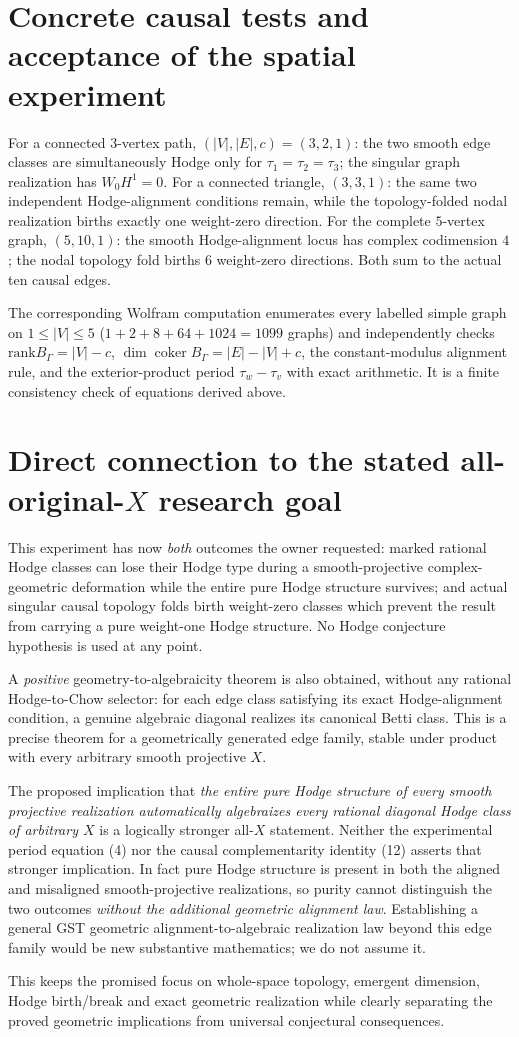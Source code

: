 \documentclass[11pt]{article}
\begin{document}
\section{Concrete causal tests and acceptance of the spatial experiment}
For a connected $3$-vertex path, $(|V|,|E|,c)=(3,2,1)$:
the two smooth edge classes are simultaneously Hodge
only for $\tau_1=\tau_2=\tau_3$;
the singular graph realization has $W_0H^1=0$.
For a connected triangle, $(3,3,1)$:
the same two independent Hodge-alignment conditions
remain, while the topology-folded nodal realization
births exactly one weight-zero direction.
For the complete $5$-vertex graph, $(5,10,1)$:
the smooth Hodge-alignment locus has complex
codimension $4$; the nodal topology fold births
$6$ weight-zero directions. Both sum to the
actual ten causal edges.

The corresponding Wolfram computation enumerates
every labelled simple graph on $1\le |V|\le5$
($1+2+8+64+1024=1099$ graphs) and independently
checks $\mathrm{rank} B_\Gamma=|V|-c$,
$\dim\operatorname{coker}B_\Gamma=|E|-|V|+c$,
the constant-modulus alignment rule, and the
exterior-product period
$\tau_w-\tau_v$ with exact arithmetic. It is a
finite consistency check of equations derived above.

\section{Direct connection to the stated all-original-$X$ research goal}
This experiment has now \emph{both} outcomes the
owner requested: marked rational Hodge classes
can lose their Hodge type during a smooth-projective
complex-geometric deformation while the entire
pure Hodge structure survives; and actual singular
causal topology folds birth weight-zero classes
which prevent the result from carrying a pure
weight-one Hodge structure. No Hodge conjecture
hypothesis is used at any point.

A \emph{positive} geometry-to-algebraicity theorem
is also obtained, without any rational Hodge-to-Chow
selector: for each edge class satisfying its exact
Hodge-alignment condition, a genuine algebraic
diagonal realizes its canonical Betti class.
This is a precise theorem for a geometrically
generated edge family, stable under product with
every arbitrary smooth projective $X$.

The proposed implication that \emph{the entire pure
Hodge structure of every smooth projective
realization automatically algebraizes every
rational diagonal Hodge class of arbitrary $X$}
is a logically stronger all-$X$ statement.
Neither the experimental period equation (4)
nor the causal complementarity identity (12)
asserts that stronger implication. In fact
pure Hodge structure is present in both the
aligned and misaligned smooth-projective
realizations, so purity cannot distinguish the
two outcomes \emph{without the additional
geometric alignment law}. Establishing a general
GST geometric alignment-to-algebraic realization
law beyond this edge family would be new
substantive mathematics; we do not assume it.

This keeps the promised focus on whole-space
topology, emergent dimension, Hodge birth/break
and exact geometric realization while clearly
separating the proved geometric implications
from universal conjectural consequences.
\end{document}
